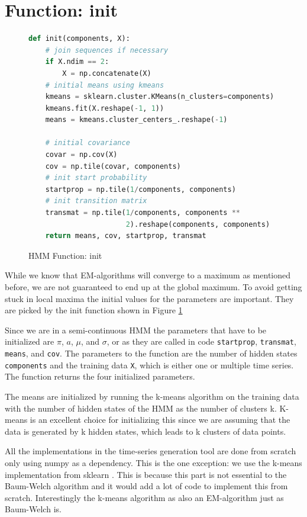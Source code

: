\section{Function: init}

\begin{figure}
\begin{singlespace}
\begin{lstlisting}[language=Python]
def init(components, X):
    # join sequences if necessary
    if X.ndim == 2:
        X = np.concatenate(X)
    # initial means using kmeans
    kmeans = sklearn.cluster.KMeans(n_clusters=components)
    kmeans.fit(X.reshape(-1, 1))
    means = kmeans.cluster_centers_.reshape(-1)

    # initial covariance
    covar = np.cov(X)
    cov = np.tile(covar, components)
    # init start probability
    startprop = np.tile(1/components, components)
    # init transition matrix
    transmat = np.tile(1/components, components **
                       2).reshape(components, components)
    return means, cov, startprop, transmat
\end{lstlisting}
\end{singlespace}
   
\caption{HMM Function: init}    
\label{fig:hmm-init-listing}
\end{figure}

While we know that EM-algorithms will converge to a maximum as mentioned before, we are not guaranteed to end up at the global maximum. To avoid getting stuck in local maxima the initial values for the parameters are important. They are picked by the init function shown in Figure \ref{fig:hmm-init-listing}

Since we are in a semi-continuous HMM the parameters that have to be initialized are $\pi$, $a$, $\mu$, and $\sigma$, or as they are called in code \texttt{startprop}, \texttt{transmat}, \texttt{means}, and \texttt{cov}. The parameters to the function are the number of hidden states \texttt{components} and the training data \texttt{X}, which is either one or multiple time series. The function returns the four initialized parameters. 

The means are initialized by running the k-means algorithm on the training data with the number of hidden states of the HMM as the number of clusters k. K-means is an excellent choice for initializing this since we are assuming that the data is generated by k hidden states, which leads to k clusters of data points. 

All the implementations in the time-series generation tool are done from scratch only using numpy as a dependency. This is the one exception: we use the k-means implementation from sklearn \parencite{pedregosa2011scikit}.  This is because this part is not essential to the Baum-Welch algorithm and it would add a lot of code to implement this from scratch. Interestingly the k-means algorithm as also an EM-algorithm just as Baum-Welch is. 

